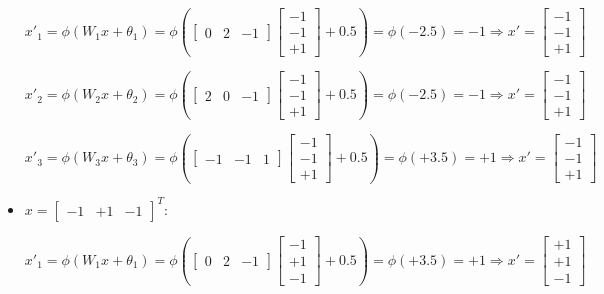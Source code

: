 \documentclass[letterpaper,headings=standardclasses]{scrartcl}
\begin{document}
\begin{itemize}
$$ x'_{1} = \phi(W_1 x + \theta_1) = \phi \left( \left[ \begin{matrix} 0 & 2 & -1 \end{matrix} \right] \left[ \begin{matrix} -1 \\ -1 \\ +1 \end{matrix} \right] + 0.5 \right) = \phi \left( -2.5 \right) = -1 \Rightarrow x' = \left[ \begin{matrix} -1 \\ -1 \\ +1 \end{matrix} \right] $$

$$ x'_{2} = \phi(W_2 x + \theta_2) = \phi \left( \left[ \begin{matrix} 2 & 0 & -1 \end{matrix} \right] \left[ \begin{matrix} -1 \\ -1 \\ +1 \end{matrix} \right] + 0.5 \right) = \phi \left( -2.5 \right) = -1 \Rightarrow x' = \left[ \begin{matrix} -1 \\ -1 \\ +1 \end{matrix} \right] $$

$$ x'_{3} = \phi(W_3 x + \theta_3) = \phi \left( \left[ \begin{matrix} -1 & -1 & 1 \end{matrix} \right] \left[ \begin{matrix} -1 \\ -1 \\ +1 \end{matrix} \right] + 0.5 \right) = \phi \left( +3.5 \right) = +1 \Rightarrow x' = \left[ \begin{matrix} -1 \\ -1 \\ +1 \end{matrix} \right] $$

\item $x = [\begin{matrix} -1 & +1 & -1 \end{matrix}]^T$:

$$ x'_{1} = \phi(W_1 x + \theta_1) = \phi \left( \left[ \begin{matrix} 0 & 2 & -1 \end{matrix} \right] \left[ \begin{matrix} -1 \\ +1 \\ -1 \end{matrix} \right] + 0.5 \right) = \phi \left( +3.5 \right) = +1 \Rightarrow x' = \left[ \begin{matrix} +1 \\ +1 \\ -1 \end{matrix} \right] $$


\end{itemize}
\end{document}
